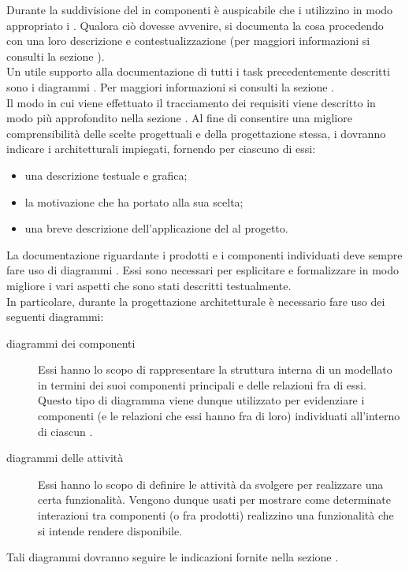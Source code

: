 			Durante la suddivisione del  in componenti è auspicabile che i  utilizzino in modo appropriato i . Qualora ciò dovesse avvenire, si documenta la cosa procedendo con una loro descrizione e contestualizzazione (per maggiori informazioni si consulti la sezione ).\\
			Un utile supporto alla documentazione di tutti i task precedentemente descritti sono i diagrammi . Per maggiori informazioni si consulti la sezione .\\
			Il modo in cui viene effettuato il tracciamento dei requisiti viene descritto in modo più approfondito nella sezione .
				 \label{sec:ProgArcDesingPattern}
					Al fine di consentire una migliore comprensibilità delle scelte progettuali e della progettazione stessa, i  dovranno indicare i  architetturali impiegati, fornendo per ciascuno di essi:
					\begin{itemize}
						\item una descrizione testuale e grafica;
						\item la motivazione che ha portato alla sua scelta;
						\item una breve descrizione dell'applicazione del  al progetto.
					\end{itemize}
				 \label{sec:ProgArcUML}
					La documentazione riguardante i prodotti e i componenti individuati deve sempre fare uso di diagrammi . Essi sono necessari per esplicitare e formalizzare in modo migliore i vari aspetti che sono stati descritti testualmente.\\
					In particolare, durante la progettazione architetturale è necessario fare uso dei seguenti diagrammi:
					\begin{description}
						\item[diagrammi dei componenti] Essi hanno lo scopo di rappresentare la struttura interna di un   modellato in termini dei suoi componenti principali e delle relazioni fra di essi. Questo tipo di diagramma viene dunque utilizzato per evidenziare i componenti (e le relazioni che essi hanno fra di loro) individuati all'interno di ciascun  .
						\item[diagrammi delle attività] Essi hanno lo scopo di definire le attività da svolgere per realizzare una certa funzionalità. Vengono dunque usati per mostrare come determinate interazioni tra componenti (o fra prodotti) realizzino una funzionalità che si intende rendere disponibile.
					\end{description}
					Tali diagrammi dovranno seguire le indicazioni fornite nella sezione .

